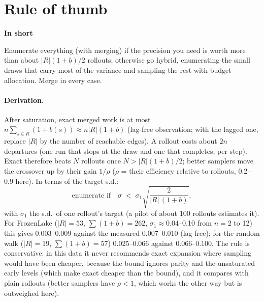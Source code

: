 \documentclass[11pt]{article}
\newcommand{\shadedbox}[3]{\par\smallskip\noindent\colorbox{#1}{\parbox{\dimexpr\linewidth-2\fboxsep}{\textbf{#2}\par #3}}\par\smallskip}
\newcommand{\takeaway}[1]{\shadedbox{okbg}{In short}{#1}}
\begin{document}
\section{Rule of thumb}\label{sec:rule}

\takeaway{Enumerate everything (with merging) if the precision you need is worth more than about $|R|(1+b)/2$
rollouts; otherwise go hybrid, enumerating the small draws that carry most of the variance and sampling the rest with
budget allocation. Merge in every case.}

\paragraph{Derivation.} After saturation, exact merged work is at most $n\sum_{s\in R}(1+b(s))\approx n|R|(1+b)$
(lag-free observation; with the lagged one, replace $|R|$ by the number of reachable edges). A rollout costs about $2n$
departures (one run that stops at the draw and one that completes, per step). Exact therefore beats $N$ rollouts once
$N > |R|(1+b)/2$; better samplers move the crossover up by their gain $1/\rho$ ($\rho$ = their efficiency relative to
rollouts, 0.2--0.9 here). In terms of the target s.d.:
\[
\text{enumerate if}\quad \sigma \;<\; \sigma_1\sqrt{\frac{2}{|R|\,(1+b)}},
\]
with $\sigma_1$ the s.d.\ of one rollout's target (a pilot of about 100 rollouts estimates it). For FrozenLake
($|R|=53$, $\sum(1+b)=262$, $\sigma_1\approx0.04$--0.10 from $n=2$ to 12) this gives 0.003--0.009 against the
measured 0.007--0.010 (lag-free); for the random walk ($|R|=19$, $\sum(1+b)=57$) 0.025--0.066 against 0.066--0.100. The
rule is conservative: in this data it never recommends exact expansion where sampling would have been cheaper, because
the bound ignores parity and the unsaturated early levels (which make exact cheaper than the bound), and it compares
with plain rollouts (better samplers have $\rho<1$, which works the other way but is outweighed here).
\end{document}
